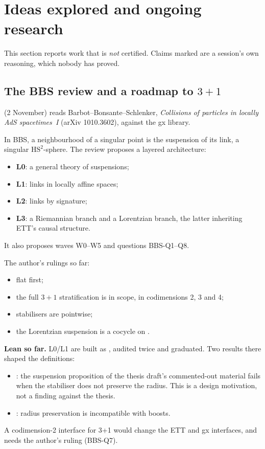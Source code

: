 \section{Ideas explored and ongoing research}\label{sec:research}

This section reports work that is \emph{not} certified. Claims marked \unv{} are a session's own
reasoning, which nobody has proved.

\subsection{The BBS review and a roadmap to $3+1$}

 (2 November) reads Barbot--Bonsante--Schlenker, \emph{Collisions of
particles in locally AdS spacetimes~I} (arXiv 1010.3602), against the gx library.

In BBS, a neighbourhood of a singular point is the suspension of its link, a singular
$\mathrm{HS}^2$-sphere. The review proposes a layered architecture:
\begin{itemize}
\item \textbf{L0}: a general theory of suspensions;
\item \textbf{L1}: links in locally affine spaces;
\item \textbf{L2}: links by signature;
\item \textbf{L3}: a Riemannian branch and a Lorentzian branch, the latter inheriting ETT's
  causal structure.
\end{itemize}
It also proposes waves W0--W5 and questions BBS-Q1--Q8.

The author's rulings so far:
\begin{itemize}
\item flat first;
\item the full $3+1$ stratification is in scope, in codimensions 2, 3 and 4;
\item stabilisers are pointwise;
\item the Lorentzian suspension is a cocycle on .
\end{itemize}

\textbf{Lean so far.} L0/L1 are built as , audited
twice and graduated. Two results there shaped the definitions:
\begin{itemize}
\item {}: the suspension proposition of the thesis draft's
  commented-out material fails when the stabiliser does not preserve the radius. This is a design
  motivation, not a finding against the thesis.
\item {}: radius preservation is incompatible with
  boosts.
\end{itemize}
A codimension-2 interface for 3+1 would change the ETT and gx interfaces, and needs the author's
ruling (BBS-Q7).

